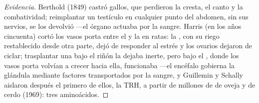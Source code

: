 \begin{proof}[Evidencia]
Berthold (1849) castró gallos, que perdieron la cresta, el canto y la
combatividad; reimplantar un testículo en cualquier punto del abdomen,
sin sus nervios, se los devolvió ---el órgano actuaba por la sangre.
Harris (en los años cincuenta) cortó los vasos porta entre el
 y la  en ratas: la , con su riego
restablecido desde otra parte, dejó de responder al estrés y los
ovarios dejaron de ciclar; trasplantar una  bajo el riñón la
dejaba inerte, pero bajo el , donde los vasos porta volvían a
crecer hacia ella, funcionaba ---el encéfalo gobierna la glándula
mediante factores transportados por la sangre, y Guillemin y Schally
aislaron después el primero de ellos, la TRH, a partir de millones de
 de oveja y de cerdo (1969): tres aminoácidos.
\end{proof}

